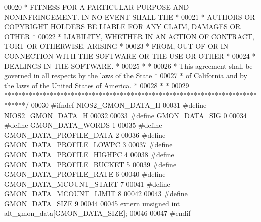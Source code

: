 \begin{DoxyCode}
00020 \textcolor{comment}{* FITNESS FOR A PARTICULAR PURPOSE AND NONINFRINGEMENT. IN NO EVENT SHALL THE *}
00021 \textcolor{comment}{* AUTHORS OR COPYRIGHT HOLDERS BE LIABLE FOR ANY CLAIM, DAMAGES OR OTHER      *}
00022 \textcolor{comment}{* LIABILITY, WHETHER IN AN ACTION OF CONTRACT, TORT OR OTHERWISE, ARISING     *}
00023 \textcolor{comment}{* FROM, OUT OF OR IN CONNECTION WITH THE SOFTWARE OR THE USE OR OTHER         *}
00024 \textcolor{comment}{* DEALINGS IN THE SOFTWARE.                                                   *}
00025 \textcolor{comment}{*                                                                             *}
00026 \textcolor{comment}{* This agreement shall be governed in all respects by the laws of the State   *}
00027 \textcolor{comment}{* of California and by the laws of the United States of America.              *}
00028 \textcolor{comment}{*                                                                             *}
00029 \textcolor{comment}{******************************************************************************/}
00030 \textcolor{preprocessor}{#ifndef NIOS2\_GMON\_DATA\_H}
00031 \textcolor{preprocessor}{#define NIOS2\_GMON\_DATA\_H}
00032 
00033 \textcolor{preprocessor}{#define GMON\_DATA\_SIG  0}
00034 \textcolor{preprocessor}{#define GMON\_DATA\_WORDS 1}
00035 \textcolor{preprocessor}{#define GMON\_DATA\_PROFILE\_DATA 2}
00036 \textcolor{preprocessor}{#define GMON\_DATA\_PROFILE\_LOWPC 3}
00037 \textcolor{preprocessor}{#define GMON\_DATA\_PROFILE\_HIGHPC 4}
00038 \textcolor{preprocessor}{#define GMON\_DATA\_PROFILE\_BUCKET 5}
00039 \textcolor{preprocessor}{#define GMON\_DATA\_PROFILE\_RATE 6}
00040 \textcolor{preprocessor}{#define GMON\_DATA\_MCOUNT\_START 7}
00041 \textcolor{preprocessor}{#define GMON\_DATA\_MCOUNT\_LIMIT 8}
00042 
00043 \textcolor{preprocessor}{#define GMON\_DATA\_SIZE 9}
00044 
00045 \textcolor{keyword}{extern} \textcolor{keywordtype}{unsigned} \textcolor{keywordtype}{int} alt_gmon_data[GMON_DATA_SIZE];
00046 
00047 \textcolor{preprocessor}{#endif}
\end{DoxyCode}

